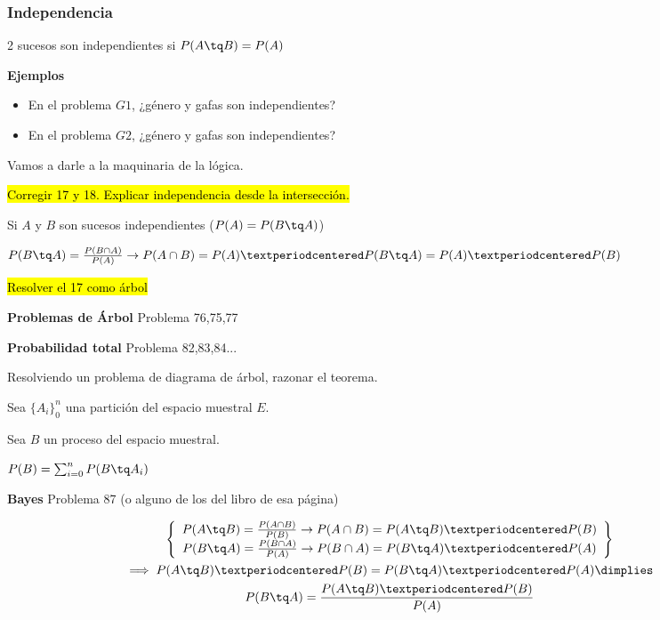 \subsubsection{Independencia}

\begin{defn}[Independencia]
2 sucesos son independientes si $P(A \tq B) = P(A)$
\end{defn}

\textbf{Ejemplos}
\begin{itemize}
	\item En el problema $G1$, ¿género y gafas son independientes?
	\item En el problema $G2$, ¿género y gafas son independientes?
\end{itemize}

Vamos a darle a la maquinaria de la lógica.


\hl{Corregir 17 y 18. 
Explicar independencia desde la intersección.
}
\begin{corol}
Si $A$ y $B$ son sucesos independientes ($P(A) = P(B\tq A)$)

$P(B\tq A) = \frac{P(B\cap A)}{P(A)} \to P(A\cap B) = P(A) · P(B\tq A) = P(A) · P(B)$
\end{corol}



\hl{Resolver el 17 como árbol}

\textbf{Problemas de Árbol}
Problema 76,75,77

\textbf{Probabilidad total}
Problema 82,83,84...

Resolviendo un problema de diagrama de árbol, razonar el teorema.
\begin{theorem}
Sea $\{A_i\}_0^n$ una partición del espacio muestral $E$.

Sea $B$ un proceso del espacio muestral.

$P(B) = \sum_{i=0}^n P(B\tq A_i)$
\end{theorem}


\textbf{Bayes}
Problema 87 (o alguno de los del libro de esa página)

\begin{theorem}[Bayes]
\begin{gather*}
\left\{
\begin{array}{c}
	P(A\tq B) = \frac{P(A\cap B)}{P(B)} \to P(A\cap B) = P(A\tq B)· P(B)\\
	P(B\tq A) = \frac{P(B\cap A)}{P(A)} \to P(B\cap A) = P(B\tq A)· P(A)
\end{array} \right\} 
\\
\implies P(A\tq B)· P(B) = P(B\tq A)· P(A) \dimplies 
\\
P(B\tq A) = \frac{P(A\tq B)· P(B)}{P(A)}
\end{gather*}
\end{theorem}

